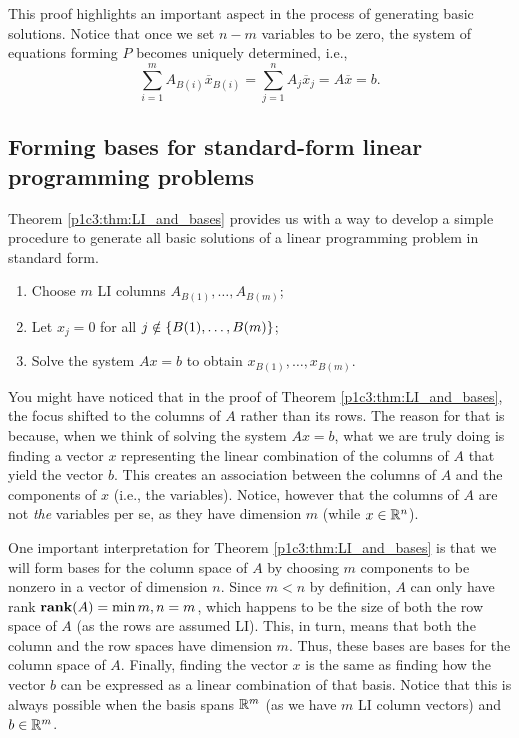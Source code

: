 This proof highlights an important aspect in the process of generating basic solutions. Notice that once we set $n-m$ variables to be zero, the system of equations forming $P$ becomes uniquely determined, i.e., 
%
\begin{equation*}
	\sum_{i=1}^m A_{B(i)}\overline{x}_{B(i)} = \sum_{j=1}^n A_j\overline{x}_j = A\overline{x} = b.
\end{equation*}	
%


\subsection{Forming bases for standard-form linear programming problems}

Theorem \ref{p1c3:thm:LI_and_bases} provides us with a way to develop a simple procedure to generate all basic solutions of a linear programming problem in standard form.

\begin{enumerate}
	\item Choose $m$ LI columns $A_{B(1)}, \dots, A_{B(m)}$;
	\item Let $x_j = 0$ for all $j \notin \left\{ B(1), \dots, B(m) \right \}$;
	\item Solve the system $Ax = b$ to obtain $x_{B(1)}, \dots, x_{B(m)}$.
\end{enumerate}

You might have noticed that in the proof of Theorem \ref{p1c3:thm:LI_and_bases}, the focus shifted to the columns of $A$ rather than its rows. The reason for that is because, when we think of solving the system $Ax = b$, what we are truly doing is finding a vector $x$ representing the linear combination of the columns of $A$ that yield the vector $b$. This creates an association between the columns of $A$ and the components of $x$ (i.e., the variables). Notice, however that the columns of $A$ are not \emph{the} variables per se, as they have dimension $m$ (while $x \in \mathbb{R}^n$). 

One important interpretation for Theorem \ref{p1c3:thm:LI_and_bases} is that we will form bases for the column space of $A$ by choosing $m$ components to be nonzero in a vector of dimension $n$. Since $m < n$ by definition, $A$ can only have rank $\mathop{\bf rank}(A) = \min{m,n} = m$, which happens to be the size of both the row space of $A$ (as the rows are assumed LI). This, in turn, means that both the column and the row spaces have dimension $m$. Thus, these bases are bases for the column space of $A$. Finally, finding the vector $x$ is the same as finding how the vector $b$ can be expressed as a linear combination of that basis. Notice that this is always possible when the basis spans $\mathbb{R}^m$ (as we have $m$ LI column vectors) and $b \in \mathbb{R}^m$.

